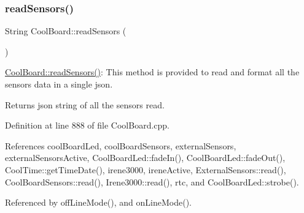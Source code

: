\subsubsection{\texorpdfstring{read\+Sensors()}{readSensors()}}
{\footnotesize\ttfamily String Cool\+Board\+::read\+Sensors (\begin{DoxyParamCaption}{ }\end{DoxyParamCaption})}

\hyperlink{classCoolBoard_ad03abdce2e65f520bbf2cff0f2d083cf}{Cool\+Board\+::read\+Sensors()}\+: This method is provided to read and format all the sensors data in a single json.

\begin{DoxyReturn}{Returns}
json string of all the sensors read. 
\end{DoxyReturn}


Definition at line 888 of file Cool\+Board.\+cpp.



References cool\+Board\+Led, cool\+Board\+Sensors, external\+Sensors, external\+Sensors\+Active, Cool\+Board\+Led\+::fade\+In(), Cool\+Board\+Led\+::fade\+Out(), Cool\+Time\+::get\+Time\+Date(), irene3000, irene\+Active, External\+Sensors\+::read(), Cool\+Board\+Sensors\+::read(), Irene3000\+::read(), rtc, and Cool\+Board\+Led\+::strobe().



Referenced by off\+Line\+Mode(), and on\+Line\+Mode().


